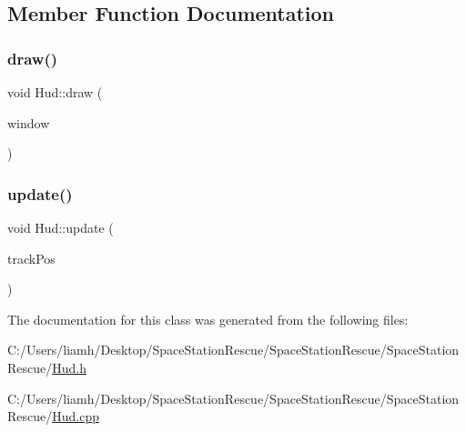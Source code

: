 \subsection{Member Function Documentation}
\mbox{\label{class_hud_a1c1203c0ee146cef7b5075a4c6454d79}} 
\subsubsection{\texorpdfstring{draw()}{draw()}}
{\footnotesize\ttfamily void Hud\+::draw (\begin{DoxyParamCaption}\item[{sf\+::\+Render\+Window \&}]{window }\end{DoxyParamCaption})}

\mbox{\label{class_hud_a536a4859da383379fbb8cecacb356314}} 
\subsubsection{\texorpdfstring{update()}{update()}}
{\footnotesize\ttfamily void Hud\+::update (\begin{DoxyParamCaption}\item[{sf\+::\+Vector2f}]{track\+Pos }\end{DoxyParamCaption})}



The documentation for this class was generated from the following files\+:\begin{DoxyCompactItemize}
\item 
C\+:/\+Users/liamh/\+Desktop/\+Space\+Station\+Rescue/\+Space\+Station\+Rescue/\+Space\+Station\+Rescue/\mbox{\hyperlink{_hud_8h}{Hud.\+h}}\item 
C\+:/\+Users/liamh/\+Desktop/\+Space\+Station\+Rescue/\+Space\+Station\+Rescue/\+Space\+Station\+Rescue/\mbox{\hyperlink{_hud_8cpp}{Hud.\+cpp}}\end{DoxyCompactItemize}
